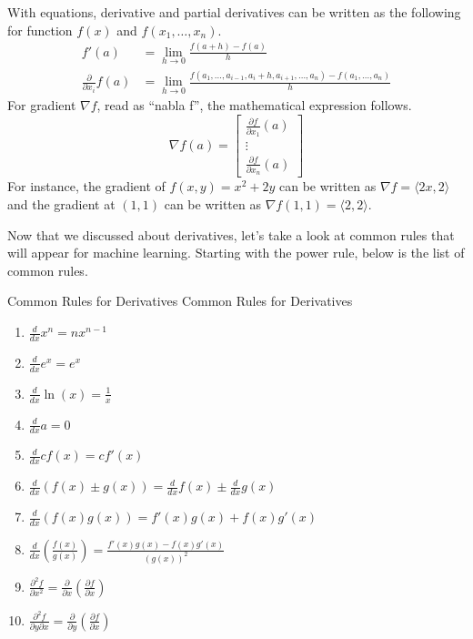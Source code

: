 \documentclass[../../../main.tex]{subfiles}
\begin{document}
With equations, derivative and partial derivatives can be written
as the following for function $f(x)$ and $f(x_1, \ldots, x_n)$.
\begin{align*}
    f'(a)
    &= \lim_{h \to 0} \frac{f(a + h) - f(a)}{h} \\
    \frac{\partial}{\partial x_i} f(a)
    &= \lim_{h \to 0}
        \frac{f(a_1, \ldots, a_{i-1}, a_i + h, a_{i+1}, \ldots, a_n)
                - f(a_1, \ldots, a_n)}{h}
\end{align*}
For gradient $\nabla f$, read as ``nabla f'', the mathematical
expression follows.
\[
\nabla f(a) =
\begin{bmatrix}
    \frac{\partial f}{\partial x_1} (a) \\
    \vdots \\
    \frac{\partial f}{\partial x_n} (a)
\end{bmatrix}
\]
For instance, the gradient of $f(x, y) = x^2 + 2y$ can be written as
$\nabla f = \langle 2x, 2 \rangle$ and the gradient at $(1, 1)$ 
can be written as $\nabla f(1, 1) = \langle 2, 2 \rangle$.

Now that we discussed about derivatives, let's take a look at common
rules that will appear for machine learning. Starting with the
power rule, below is the list of common rules.

\begin{theorem}
{Common Rules for Derivatives}
{Common Rules for Derivatives}
\begin{enumerate}[noitemsep]
\item $\frac{d}{dx} x^n = n x^{n-1}$
\item $\frac{d}{dx} e^x = e^x$
\item $\frac{d}{dx} \ln(x) = \frac{1}{x}$
\item $\frac{d}{dx} a = 0$
\item $\frac{d}{dx} cf(x) = cf'(x)$
\item $\frac{d}{dx} \left( f(x) \pm g(x) \right)
       = \frac{d}{dx} f(x) \pm \frac{d}{dx} g(x)$
\item $\frac{d}{dx} \left( f(x) g(x) \right)
       = f'(x)g(x) + f(x)g'(x)$
\item $\frac{d}{dx} \left( \frac{f(x)}{g(x)} \right)
       = \frac{f'(x)g(x) - f(x)g'(x)}{\left(g(x)\right)^2}$
\item $\frac{\partial^2 f}{\partial x^2}
       = \frac{\partial}{\partial x}
            \left( \frac{\partial f}{\partial x} \right)$
\item $\frac{\partial^2 f}{\partial y \partial x}
       = \frac{\partial}{\partial y}
            \left( \frac{\partial f}{\partial x} \right)$
\end{enumerate}
\end{theorem}
\end{document}
